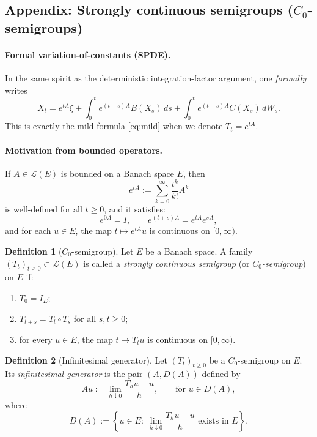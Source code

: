\documentclass[11pt]{article}
\theoremstyle{definition}
\newtheorem{definition}{Definition}
\theoremstyle{remark}
\begin{document}
\subsection*{Appendix: Strongly continuous semigroups ($C_0$-semigroups)}

\paragraph{Formal variation-of-constants (SPDE).}
In the same spirit as the deterministic integration-factor argument, one \emph{formally} writes
\[
    X_t
    =
    e^{tA}\xi
    + \int_0^t e^{(t-s)A} B(X_s)\,ds
    + \int_0^t e^{(t-s)A} C(X_s)\,dW_s.
\]
This is exactly the mild formula \eqref{eq:mild} when we denote $T_t = e^{tA}$.

\paragraph{Motivation from bounded operators.}
If $A \in \mathcal{L}(E)$ is bounded on a Banach space $E$, then
\[
    e^{tA} := \sum_{k=0}^{\infty} \frac{t^k}{k!}A^k
\]
is well-defined for all $t\ge 0$, and it satisfies:
\[
    e^{0A} = I, \qquad
    e^{(t+s)A} = e^{tA}e^{sA},
\]
and for each $u\in E$, the map $t\mapsto e^{tA}u$ is continuous on $[0,\infty)$.

\begin{definition}[$C_0$-semigroup]
Let $E$ be a Banach space. A family $(T_t)_{t\ge 0} \subset \mathcal{L}(E)$ is called a
\emph{strongly continuous semigroup} (or \emph{$C_0$-semigroup}) on $E$ if:
\begin{enumerate}
    \item $T_0 = I_E$;
    \item $T_{t+s} = T_t \circ T_s$ for all $s,t \ge 0$;
    \item for every $u\in E$, the map $t\mapsto T_t u$ is continuous on $[0,\infty)$.
\end{enumerate}
\end{definition}

\begin{definition}[Infinitesimal generator]
Let $(T_t)_{t\ge 0}$ be a $C_0$-semigroup on $E$. Its \emph{infinitesimal generator} is the pair $(A,D(A))$ defined by
\[
    Au
    :=
    \lim_{h\downarrow 0}\frac{T_hu-u}{h},
    \qquad \text{for } u \in D(A),
\]
where
\[
    D(A)
    :=
    \left\{
        u\in E:\;
        \lim_{h\downarrow 0}\frac{T_hu-u}{h}
        \text{ exists in } E
    \right\}.
\]
\end{definition}
\end{document}
